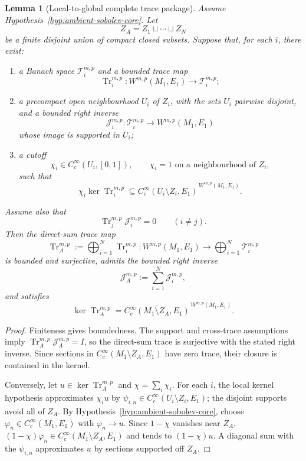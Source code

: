 \documentclass[11pt]{article}
\theoremstyle{plain}
\newtheorem{lemma}[theorem]{Lemma}
\theoremstyle{definition}
\begin{document}
\begin{lemma}[Local-to-global complete trace package]
\label{lem:local-to-global-trace-package}
Assume Hypothesis~\ref{hyp:ambient-sobolev-core}. Let
\[
  Z_A=Z_1\sqcup\cdots\sqcup Z_N
\]
be a finite disjoint union of compact closed subsets. Suppose that, for
each \(i\), there exist:

\begin{enumerate}[label=\textup{(\roman*)}]
  \item a Banach space \(\mathcal T_i^{m,p}\) and a bounded trace map
        \[
          \operatorname{Tr}_i^{m,p}:
          W^{m,p}(M_1,E_1)
          \longrightarrow
          \mathcal T_i^{m,p};
        \]

  \item a precompact open neighbourhood \(U_i\) of \(Z_i\), with the
        sets \(U_i\) pairwise disjoint, and a bounded right inverse
        \[
          \mathcal J_i^{m,p}:
          \mathcal T_i^{m,p}
          \longrightarrow
          W^{m,p}(M_1,E_1)
        \]
        whose image is supported in \(U_i\);

  \item a cutoff
        \[
          \chi_i\in C_c^\infty(U_i,[0,1]),
          \qquad
          \chi_i=1
          \text{ on a neighbourhood of }Z_i,
        \]
        such that
        \[
          \chi_i\ker\operatorname{Tr}_i^{m,p}
          \subseteq
          \overline{
            C_c^\infty(U_i\setminus Z_i,E_1)
          }^{\,W^{m,p}(M_1,E_1)}.
        \]
\end{enumerate}

Assume also that
\[
  \operatorname{Tr}_j^{m,p}
  \mathcal J_i^{m,p}=0
  \qquad
  (i\neq j).
\]
Then the direct-sum trace map
\[
  \operatorname{Tr}_A^{m,p}
  :=
  \bigoplus_{i=1}^N
  \operatorname{Tr}_i^{m,p}
  :
  W^{m,p}(M_1,E_1)
  \longrightarrow
  \bigoplus_{i=1}^N\mathcal T_i^{m,p}
\]
is bounded and surjective, admits the bounded right inverse
\[
  \mathcal J_A^{m,p}
  :=
  \sum_{i=1}^N\mathcal J_i^{m,p},
\]
and satisfies
\[
  \boxed{
  \ker\operatorname{Tr}_A^{m,p}
  =
  \overline{
    C_c^\infty(M_1\setminus Z_A,E_1)
  }^{\,W^{m,p}(M_1,E_1)}.
  }
\]
\end{lemma}

\begin{proof}
Finiteness gives boundedness. The support and cross-trace assumptions imply
\(\operatorname{Tr}_A^{m,p}\mathcal J_A^{m,p}=I\), so the direct-sum trace is surjective with the stated right inverse. Since sections in \(C_c^\infty(M_1\setminus Z_A,E_1)\) have zero trace, their closure is contained in the kernel.

Conversely, let \(u\in\ker\operatorname{Tr}_A^{m,p}\) and \(\chi=\sum_i\chi_i\). For each \(i\), the local kernel hypothesis approximates \(\chi_i u\) by \(\psi_{i,n}\in C_c^\infty(U_i\setminus Z_i,E_1)\); the disjoint supports avoid all of \(Z_A\). By Hypothesis~\ref{hyp:ambient-sobolev-core}, choose \(\varphi_n\in C_c^\infty(M_1,E_1)\) with \(\varphi_n\to u\). Since \(1-\chi\) vanishes near \(Z_A\), \((1-\chi)\varphi_n\in C_c^\infty(M_1\setminus Z_A,E_1)\) and tends to \((1-\chi)u\). A diagonal sum with the \(\psi_{i,n}\) approximates \(u\) by sections supported off \(Z_A\).
\end{proof}
\end{document}
